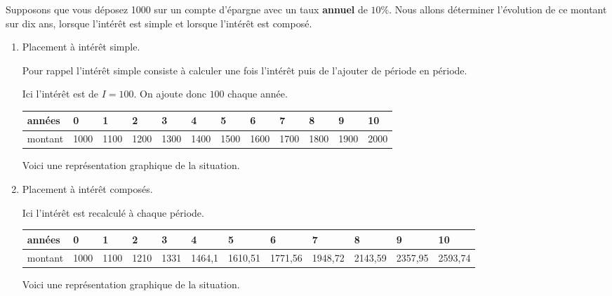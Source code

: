 \documentclass[a4paper,12pt,singlepage]{report}
\begin{document}
Supposons que vous déposez 1000\texteuro{} sur un compte d'épargne avec un taux \textbf{annuel}
de \(10\%\). Nous allons déterminer l'évolution de ce montant sur dix ans, lorsque
l'intérêt est simple et lorsque l'intérêt est composé.

\begin{enumerate}
\item Placement à intérêt simple.
\label{sec:org5ed7ffd}

Pour rappel l'intérêt simple consiste à calculer une fois l'intérêt puis de
l'ajouter de période en période.

Ici l'intérêt est de \(I=100\). On ajoute donc \(100\) \texteuro{} chaque année.

\begin{center}
\begin{tabular}{|l|p{1cm}|p{1cm}|p{1cm}|p{1cm}|p{1cm}|p{1cm}|p{1cm}|p{1cm}|p{1cm}|p{1cm}|p{1cm}|}
\hline
années & 0 & 1 & 2 & 3 & 4 & 5 & 6 & 7 & 8 & 9 & 10\\[0pt]
\hline
montant & 1000 & 1100 & 1200 & 1300 & 1400 & 1500 & 1600 & 1700 & 1800 & 1900 & 2000\\[0pt]
\hline
\end{tabular}
\end{center}

Voici une représentation graphique de la situation.

\begin{center}

\end{center}

\item Placement à intérêt composés.
\label{sec:org081701f}

Ici l'intérêt est recalculé à chaque période.

\begin{center}
\begin{tabular}{|l|p{0.8cm}|p{0.8cm}|p{0.8cm}|p{0.8cm}|p{1cm}|p{1.1cm}|p{1.1cm}|p{1.1cm}|p{1.1cm}|p{1.1cm}|p{1.1cm}|}
\hline
années & 0 & 1 & 2 & 3 & 4 & 5 & 6 & 7 & 8 & 9 & 10\\[0pt]
\hline
montant & 1000 & 1100 & 1210 & 1331 & 1464,1 & 1610,51 & 1771,56 & 1948,72 & 2143,59 & 2357,95 & 2593,74\\[0pt]
\hline
\end{tabular}
\end{center}


Voici une représentation graphique de la situation.

\begin{center}

\end{center}


\end{enumerate}
\end{document}
